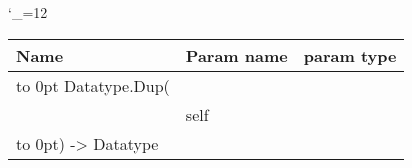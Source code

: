 \begingroup \catcode`\_=12 \tt
\begin{tabular}{lll}
\toprule
\textrm{Name}&\textrm{Param name}&\textrm{param type}\\
\midrule
\hbox to 0pt {Datatype.Dup(\hss}\\
& self\\
\hbox to 0pt{) -> Datatype\hss}\\
\bottomrule
\end{tabular}
\endgroup
